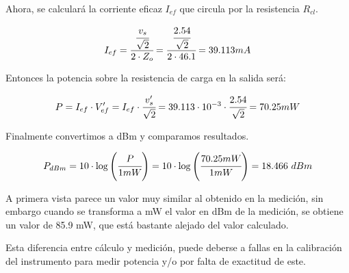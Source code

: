 Ahora, se calculará la corriente eficaz $I_{ef}$ que circula por la resistencia $R_{cl}$.

\begin{equation*}
    I_{ef} = \cfrac{\cfrac{v_s}{\sqrt{2}}}{2 \cdot Z_o} 
    = \cfrac{\cfrac{2.54}{\sqrt{2}}}{2 \cdot 46.1} = 39.113 mA
\end{equation*}

Entonces la potencia sobre la resistencia de carga en la salida será:

\begin{equation*}
    P = I_{ef} \cdot V_{ef}' = I_{ef} \cdot \cfrac{v_s'}{\sqrt{2}}
    = 39.113 \cdot 10^{-3} \cdot \cfrac{2.54}{\sqrt{2}} = 70.25 mW
\end{equation*}

Finalmente convertimos a dBm y comparamos resultados.

\begin{equation*}
    P_{dBm} = 10 \cdot \log \left( \cfrac{P}{1 mW} \right) = 10 \cdot \log \left( \cfrac{70.25 mW}{1 mW} \right) = 18.466 ~dBm
\end{equation*}

A primera vista parece un valor muy similar al obtenido en la medición, sin embargo cuando se transforma a mW el valor en dBm de la medición, se obtiene un valor de 85.9 mW, que está bastante alejado del valor calculado. 

Esta diferencia entre cálculo y medición, puede deberse a fallas en la calibración del instrumento para medir potencia y/o por falta de exactitud de este.

